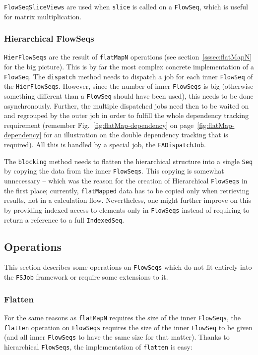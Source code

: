 \documentclass[runningheads,a4paper,fleqn]{llncs}
\begin{document}
\texttt{FlowSeqSliceViews} are used when \texttt{slice} is called on
a \texttt{FlowSeq}, which is useful for matrix multiplication.

\subsubsection{Hierarchical FlowSeqs}
\texttt{HierFlowSeqs} are the result of \texttt{flatMapN} operations
(see section~\ref{sssec:flatMapN} for the big picture). This is by far
the most complex concrete implementation of a \texttt{FlowSeq}. The
\texttt{dispatch} method needs to dispatch a job for each inner
\texttt{FlowSeq} of the \texttt{HierFlowSeqs}. However, since the number of
inner \texttt{FlowSeqs} is big (otherwise something different than a \texttt{FlowSeq}
should have been used), 
this needs to be done asynchronously. Further, the multiple dispatched
jobs need then to be waited on and regrouped by the outer job in order
to fulfill the whole dependency tracking requirement (remember
Fig.~\ref{fig:flatMap-dependency} on
page~\ref{fig:flatMap-dependency} for an illustration on the
double dependency tracking that is required). All this is handled by a 
special job, the \texttt{FADispatchJob}.

The \texttt{blocking} method needs to flatten the hierarchical
structure into a single \texttt{Seq} by copying the data from the
inner \texttt{FlowSeqs}. This copying is somewhat unnecessary -- which
was the reason for the creation of Hierarchical \texttt{FlowSeqs} in the
first place; currently, \texttt{flatMapped} data has to be copied only when
retrieving results, not in a calculation flow. Nevertheless, one might
further improve on this by providing indexed access to elements only
in \texttt{FlowSeqs} instead of requiring to return a reference to a full
\texttt{IndexedSeq}.

\subsection{Operations}
\label{ssec:imp-operations}
This section describes some operations on \texttt{FlowSeqs} which do not fit
entirely into the \texttt{FSJob} framework or require some extensions
to it.

\subsubsection{Flatten}
For the same reasons as \texttt{flatMapN} requires the size of the
inner \texttt{FlowSeqs}, the \texttt{flatten} operation on
\texttt{FlowSeqs} requires the size of the inner \texttt{FlowSeq} to
be given (and all inner \texttt{FlowSeqs} to have the same size for
that matter). Thanks to hierarchical \texttt{FlowSeqs}, the
implementation of \texttt{flatten} is easy:
\end{document}
